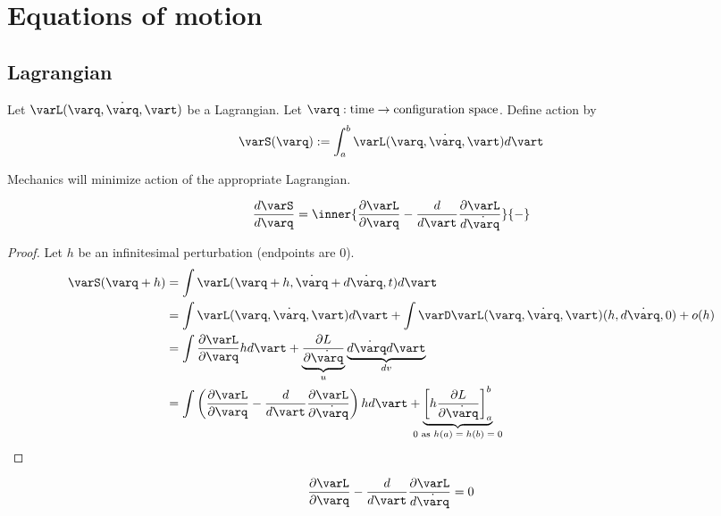 \documentclass{scrbook}
\numberwithin{thms}{section}
\newcommand{\der}{\dot}
\begin{document}
\chapter{Equations of motion}
\section{Lagrangian}
  \newcommand{\q}{\varq}
  \newcommand{\derq}{\der \q}
  \newcommand{\dt}{d\vart}
\begin{defn}[action]
  Let $\varL(\q,\derq, \vart)$ be a Lagrangian.
  Let $\q:\textrm{time}\to\textrm{configuration space}$. 
  Define action by 
  \[
    \varS(\q):=\int_a^b \varL(\q,\derq, \vart) \dt 
  \]
\end{defn}

Mechanics will minimize action of the appropriate Lagrangian.
\begin{theorem}
  \[
    \frac{d\varS}{d\q} = \inner{\frac{\partial \varL}{\partial \q} - \frac{d}{d\vart}\frac{\partial \varL}{d\derq}}{-}
  \]
\end{theorem}
\begin{proof}
  \newcommand{\dq}{h}
  \newcommand{\derdq}{h'}
  Let $\dq$ be an infinitesimal perturbation (endpoints are $0$). 
  \begin{align*}
    \varS(\q+\dq) &= \int \varL(\q+\dq,\derq + d\derq,t)\dt \\
           &= \int \varL(\q,\derq,\vart)\dt + \int \varD\varL(\varq,\derq, \vart)(\dq,d\derq,0) + o(\dq) \\
           &= \int \frac{\partial \varL}{\partial \q} \dq\dt + \underbrace{\frac{\partial L}{\partial \derq}}_{u} \underbrace{d\derq \dt}_{dv} \\
           &=\int\left(\frac{\partial \varL}{\partial \q} - \frac{d}{d\vart} \frac{\partial \varL}{\partial \derq}\right)\dq \dt + \underbrace{\left[\dq\frac{\partial L}{\partial \derq} \right]_a^b}_{\mathclap{0\textrm{ as $\dq(a)=\dq(b)=0$}}}
  \end{align*}
\end{proof}
\begin{cor}
  \[
    \frac{\partial \varL}{\partial \varq} - \frac{d}{d\vart}\frac{\partial \varL}{d\der \varq} = 0
  \]
\end{cor}
\end{document}
